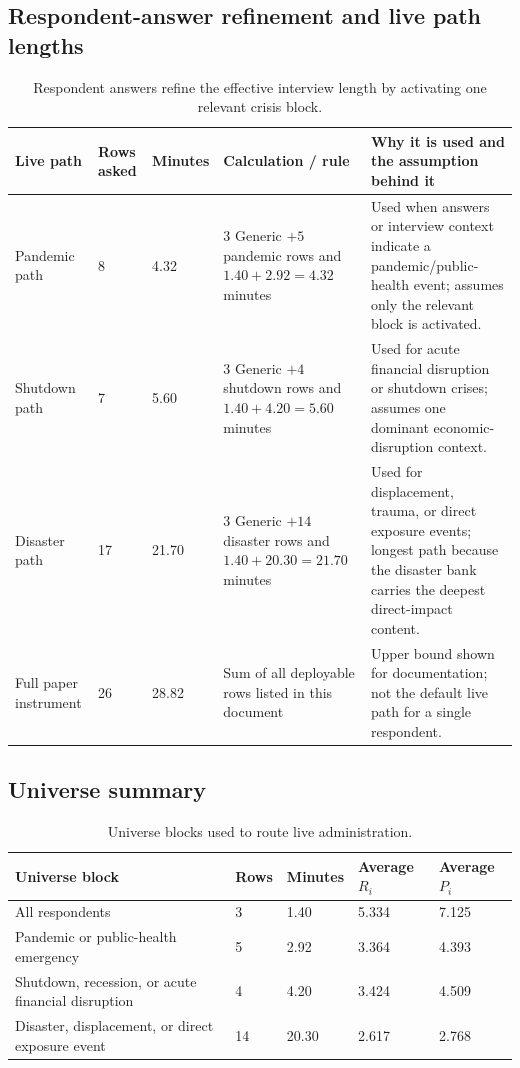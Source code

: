 \documentclass[12pt]{article}
\begin{document}
\subsection{Respondent-answer refinement and live path lengths}

\begin{table}[H]
\centering
\small
\begin{tabularx}{\textwidth}{L{0.22\textwidth} R{0.08\textwidth} R{0.10\textwidth} Y Y}
\toprule
Live path & Rows asked & Minutes & Calculation / rule & Why it is used and the assumption behind it \\
\midrule
Pandemic path & 8 & 4.32 & $3$ Generic $+ 5$ pandemic rows and $1.40 + 2.92 = 4.32$ minutes & Used when answers or interview context indicate a pandemic/public-health event; assumes only the relevant block is activated. \\
Shutdown path & 7 & 5.60 & $3$ Generic $+ 4$ shutdown rows and $1.40 + 4.20 = 5.60$ minutes & Used for acute financial disruption or shutdown crises; assumes one dominant economic-disruption context. \\
Disaster path & 17 & 21.70 & $3$ Generic $+ 14$ disaster rows and $1.40 + 20.30 = 21.70$ minutes & Used for displacement, trauma, or direct exposure events; longest path because the disaster bank carries the deepest direct-impact content. \\
Full paper instrument & 26 & 28.82 & Sum of all deployable rows listed in this document & Upper bound shown for documentation; not the default live path for a single respondent. \\
\bottomrule
\end{tabularx}
\caption{Respondent answers refine the effective interview length by activating one relevant crisis block.}
\end{table}

\subsection{Universe summary}

\begin{table}[H]
\centering
\begin{tabularx}{\textwidth}{L{0.34\textwidth} R{0.08\textwidth} R{0.10\textwidth} R{0.10\textwidth} R{0.10\textwidth}}
\toprule
Universe block & Rows & Minutes & Average $R_i$ & Average $P_i$ \\
\midrule
All respondents & 3 & 1.40 & 5.334 & 7.125 \\
Pandemic or public-health emergency & 5 & 2.92 & 3.364 & 4.393 \\
Shutdown, recession, or acute financial disruption & 4 & 4.20 & 3.424 & 4.509 \\
Disaster, displacement, or direct exposure event & 14 & 20.30 & 2.617 & 2.768 \\
\bottomrule
\end{tabularx}
\caption{Universe blocks used to route live administration.}
\end{table}
\end{document}
